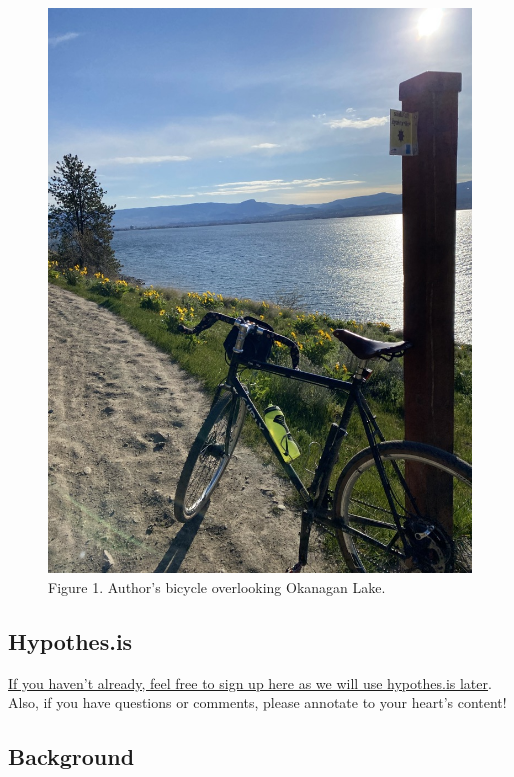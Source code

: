 \documentclass[
]{book}
\begin{document}
\begin{figure}
\centering
\includegraphics{assets/otessa22/kalamoir.jpg}
\caption{Figure 1. Author's bicycle overlooking Okanagan Lake.}
\end{figure}

\hypertarget{hypothes.is}{%
\subsection*{Hypothes.is}\label{hypothes.is}}

\href{https://web.hypothes.is/start/}{If you haven't already, feel free to sign up here as we will use hypothes.is later}. Also, if you have questions or comments, please annotate to your heart's content!

\hypertarget{background}{%
\subsection*{Background}\label{background}}
\end{document}
